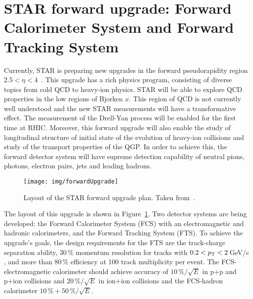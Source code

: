 
\section{STAR forward upgrade: Forward Calorimeter System and
Forward Tracking System }


Currently, STAR is preparing new upgrades in the forward pseudorapidity region $2.5 < \eta < 4$~\cite{forwardProposal}\@. This upgrade has a rich physics program, consisting of diverse topics from cold QCD to heavy-ion physics. STAR will be able to explore QCD properties in the low regions of Bjorken $x$\@. This region of QCD is not currently well understood and the new STAR measurements will have a transformative effect. The measurement of the Drell-Yan process will be enabled for the first time at RHIC\@. Moreover, this forward upgrade will also enable the study of longitudinal structure of initial state of the evolution of heavy-ion collisions and study of the transport properties of the QGP\@. In order to achieve this, the forward detector system will have supreme detection capability of neutral pions,
photons, electron pairs, jets and leading hadrons.

\begin{figure}[!htb]
\begin{center}
 \texttt{[image: img/forwardUpgrade]}\\
\end{center}
\caption[Layout of the STAR forward upgrade.]{\label{forward}Layout of the STAR forward upgrade plan. Taken from~\cite{forwardProposal}.}
\end{figure}

The layout of this upgrade is shown in Figure~\ref{forward}\@. Two detector systems are being developed: the Forward Calorimeter System (FCS) with an electromagnetic and hadronic calorimeters, and the Forward Tracking System (FTS)\@. To achieve the upgrade's goals, the design requirements for the FTS are the track-charge separation ability, 30$\,\%$ momentum resolution for tracks with 
$0.2< {p_{\mathrm{T}}} <2\,$GeV/$c$, and more than $80\,\%$ efficiency at 100 track multiplicity per event\@. The FCS-electromagnetic calorimeter should achieve accuracy of $10\,\% / \sqrt{E}$ in p+p and p+ion collisions and $20\,\% / \sqrt{E}$ in ion+ion collisions and the FCS-hadron calorimeter $10\,\% + 50\,\% / \sqrt{E}$.


